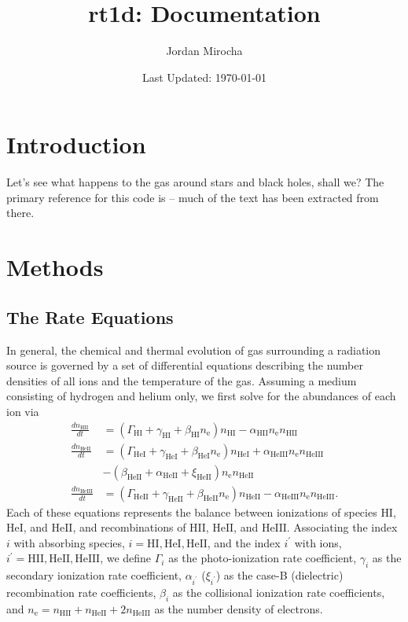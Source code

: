 \documentclass[letterpaper,titlepage,12pt]{article}
\numberwithin{equation}{section}
\newcommand{\HI}{\text{HI}}
\newcommand{\HII}{\text{HII}}
\newcommand{\HeI}{\text{HeI}}
\newcommand{\HeII}{\text{HeII}}
\newcommand{\HeIII}{\text{HeIII}}
\newcommand{\nHI}{n_{\text{HI}}}
\newcommand{\nHII}{n_{\text{HII}}}
\newcommand{\nHeI}{n_{\text{HeI}}}
\newcommand{\nHeII}{n_{\text{HeII}}}
\newcommand{\nHeIII}{n_{\text{HeIII}}}
\newcommand{\nel}{n_{\text{e}}}
\newcommand{\gHI}{\Gamma_{\text{HI}}}
\newcommand{\gHeI}{\Gamma_{\text{HeI}}}
\newcommand{\gHeII}{\Gamma_{\text{HeII}}}
\newcommand{\aHII}{\alpha_{\text{HII}}}
\newcommand{\aHeII}{\alpha_{\text{HeII}}}
\newcommand{\aHeIII}{\alpha_{\text{HeIII}}}
\newcommand{\bHI}{\beta_{\text{HI}}}
\newcommand{\bHeI}{\beta_{\text{HeI}}}
\newcommand{\bHeII}{\beta_{\text{HeII}}}
\newcommand{\xiHeII}{\xi_{\text{HeII}}}
\begin{document}
\author{Jordan Mirocha}	
\title{\Large {\bf rt1d: Documentation}}
\date{Last Updated: \today}
\maketitle

\setcounter{tocdepth}{2}
\tableofcontents
\newpage

\section{Introduction}
Let's see what happens to the gas around stars and black holes, shall we? The
primary reference for this code is
\cite[\href{http://arxiv.org/abs/1204.1944}{arxiv:1204.1944}]{Mirocha2012} --
much of the text has been extracted from there.

\section{Methods}

\subsection{The Rate Equations}
In general, the chemical and thermal evolution of gas surrounding a radiation
source is governed by a set of differential equations describing the number
densities of all ions and the temperature of the gas. Assuming a medium
consisting of hydrogen and helium only, we first solve for the abundances of
each ion via
\begin{align}
    \frac{d \nHII}{dt} & = (\gHI + \gamma_{\HI} + \bHI \nel) \nHI - \aHII \nel \nHII   \label{eq:HIIRateEquation} \\ 
    \frac{d \nHeII}{dt} & = (\gHeI + \gamma_{\HeI} + \bHeI \nel) \nHeI \nonumber + \aHeIII \nel \nHeIII \\  & - (\bHeII + \aHeII + \xiHeII) \nel \nHeII \label{eq:HeIIRateEquation} \\ 
    \frac{d \nHeIII}{dt} & = (\gHeII + \gamma_{\HeII} + \bHeII \nel) \nHeII  - \aHeIII \nel \nHeIII . \label{eq:HeIIIRateEquation}
\end{align}
Each of these equations represents the balance between ionizations of species
$\HI$, $\HeI$, and $\HeII$, and recombinations of $\HII$, $\HeII$, and
$\HeIII$. Associating the index $i$ with absorbing species, $i = \HI, \HeI,
\HeII$, and the index $i^{\prime}$ with ions, $i^{\prime} = \HII, \HeII,
\HeIII$, we define $\Gamma_i$ as the photo-ionization rate coefficient,
$\gamma_i$ as the secondary ionization rate coefficient, $\alpha_{i^{\prime}}$
($\xi_{i^{\prime}}$) as the case-B (dielectric) recombination rate
coefficients, $\beta_i$ as the collisional ionization rate coefficients, and
$\nel = \nHII + \nHeII + 2\nHeIII$ as the number density of electrons.
\end{document}

